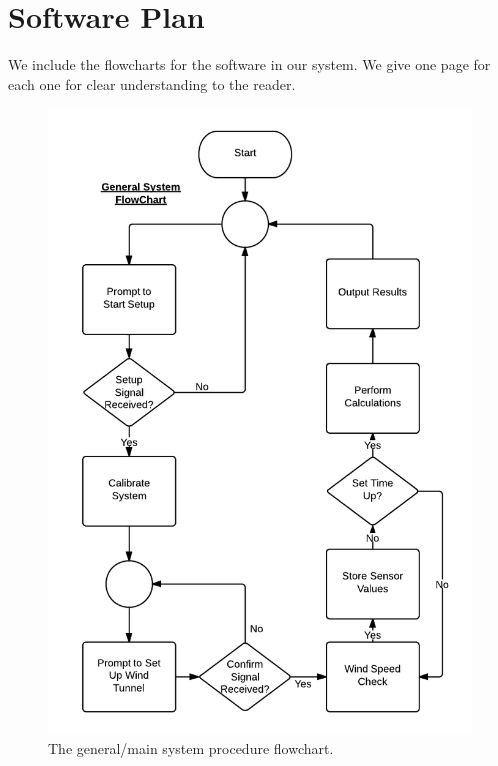 \section{Software Plan}
	We include the flowcharts for the software in our system. We give one page for each one for clear understanding to the reader.
	
	\begin{figure}[H]
		\centering
			\includegraphics[scale=0.43]{img/flowchart-outline}
		\caption{The general/main system procedure flowchart.}
	\end{figure}

